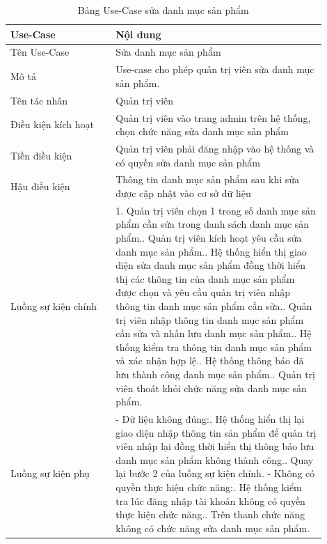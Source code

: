 \begin{longtable}[htp]{ |m{0.3\linewidth}|m{0.6\linewidth}|}
 \caption{Bảng Use-Case sửa danh mục sản phẩm \label{long}}\\
 \hline
 Use-Case & Nội dung \\
 \hline
 Tên Use-Case & Sửa danh mục sản phẩm \\
 \hline
 Mô tả & Use-case cho phép quản trị viên sửa danh mục sản phẩm.\\
 \hline
 Tên tác nhân & Quản trị viên\\
 \hline
 Điều kiện kích hoạt & Quản trị viên vào trang admin trên hệ thống, chọn chức năng sửa danh mục sản phẩm\\
 \hline
 Tiền điều kiện & Quản trị viên phải đăng nhập vào hệ thống và có quyền sửa danh mục sản phẩm\\
 \hline
 Hậu điều kiện & Thông tin danh mục sản phẩm sau khi sửa được cập nhật vào cơ sở dữ liệu\\
 \hline
 Luồng sự kiện chính & 
 1. Quản trị viên chọn 1 trong số danh mục sản phẩm cần sửa trong danh sách danh mục sản phẩm.\newline
 2. Quản trị viên kích hoạt yêu cầu sửa danh mục sản phẩm.\newline
 3. Hệ thống hiển thị giao diện sửa danh mục sản phẩm đồng thời hiển thị các thông tin của danh mục sản phẩm được chọn và yêu cầu quản trị viên nhập thông tin danh mục sản phẩm cần sửa.\newline
 4. Quản trị viên nhập thông tin danh mục sản phẩm cần sửa và nhấn lưu danh mục sản phẩm.\newline
 5. Hệ thống kiểm tra thông tin danh mục sản phẩm và xác nhận hợp lệ.\newline
 6. Hệ thống thông báo đã lưu thành công danh mục sản phẩm.\newline	
 7. Quản trị viên thoát khỏi chức năng sửa danh mục sản phẩm.
 \\
 \hline
 Luồng sự kiện phụ & 
 - Dữ liệu không đúng:\newline
  1. Hệ thống hiển thị lại giao diện nhập thông tin sản phẩm để quản trị viên nhập lại đồng thời hiển thị thông báo lưu danh mục sản phẩm không thành công.\newline
  2. Quay lại bước 2 của luồng sự kiện chính.\newline
  - Không có quyền thực hiện chức năng:\newline
  1. Hệ thống kiểm tra lúc đăng nhập tài khoản không có quyền thực hiện chức năng.\newline
  2. Trên thanh chức năng không có chức năng sửa danh mục sản phẩm.
 \\
 \hline
\end{longtable}

